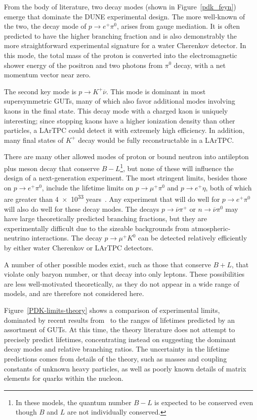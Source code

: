 From the body of literature, two decay modes (shown in Figure~\ref{pdk_feyn})
emerge that dominate the DUNE experimental design. The more
well-known of the two, the decay mode of $p \rightarrow e^+ \pi^0$,
arises from gauge mediation.  It is often predicted to have the higher
branching fraction and is also demonstrably the more straightforward
experimental signature for a water Cherenkov detector. In this mode,
the total mass of the proton is converted into the electromagnetic
shower energy of the positron and two photons from $\pi^0$ decay,
with a net momentum vector near zero. 

The second key mode is $p \rightarrow K^+ \overline{\nu}$.  This mode is
dominant in most supersymmetric GUTs, many of which also favor additional modes
involving kaons in the final state. This decay mode with a charged kaon is
uniquely interesting; since stopping kaons have a higher ionization density
than other particles, a LArTPC could detect it with extremely high efficiency.
In addition, many final states of $K^+$ decay would be fully reconstructable in
a LArTPC.

There are many other allowed modes of proton or bound neutron into
antilepton plus meson decay that conserve $B-L$\footnote{In these
  models, the quantum number $B-L$ is expected to be conserved even
  though $B$ and $L$ are not individually conserved.}, but none of
these will influence the design of a next-generation experiment. The
most stringent limits, besides those on $p \rightarrow e^+ \pi^0$,
include the lifetime limits on $p \rightarrow \mu^+ \pi^0$ and $p
\rightarrow e^+ \eta$, both of which are greater than \num{4e33} 
years~\cite{Nishino:2012ipa}. Any experiment that will do well for $p
\rightarrow e^+ \pi^0$
will also do well for these decay modes.  The decays $p \rightarrow
\overline\nu \pi^+$ or $n \rightarrow \overline\nu \pi^0$ may have
large theoretically predicted branching fractions, but they are
experimentally difficult due to the sizeable backgrounds from
atmospheric-neutrino interactions. The decay $p \rightarrow \mu^+ K^0$
can be detected relatively efficiently by either water Cherenkov or
LArTPC detectors.

A number of other possible modes exist, such as those that conserve
$B+L$, that violate only baryon number, or that decay into only
leptons. These possibilities are less well-motivated theoretically, as
they do not appear in a wide range of models, and are therefore not
considered here.

Figure~\ref{PDK-limits-theory} shows a comparison of experimental
limits, dominated by recent results from \superk\ to the
ranges of lifetimes predicted by an assortment of GUTs. At this time,
the theory literature does not attempt to precisely predict lifetimes,
concentrating instead on suggesting the dominant decay modes and
relative branching ratios. The uncertainty in the lifetime
predictions comes from details of the theory, such as masses and
coupling constants of unknown heavy particles, as well as poorly known
details of matrix elements for quarks within the nucleon.


